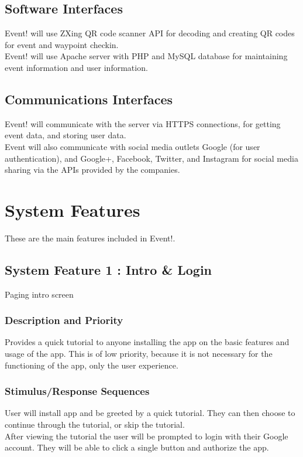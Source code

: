 \documentclass{scrreprt}
\begin{document}
\section{Software Interfaces}
Event! will use ZXing QR code scanner API for decoding and creating QR codes for 
event and waypoint checkin. \\
Event! will use Apache server with PHP and MySQL database for maintaining event 
information and user information.

\section{Communications Interfaces}
Event! will communicate with the server via HTTPS connections, for getting event 
data, and storing user data. \\
Event will also communicate with social media outlets Google (for user authentication), 
and Google+, Facebook, Twitter, and Instagram for social media sharing via the 
APIs provided by the companies.

\chapter{System Features}
These are the main features included in Event!.

\section{System Feature 1 : Intro \& Login}
Paging intro screen

\subsection{Description and Priority}
Provides a quick tutorial to anyone installing the app on the basic features and 
usage of the app. This is of low priority, because it is not necessary for the functioning 
of the app, only the user experience.

\subsection{Stimulus/Response Sequences}
User will install app and be greeted by a quick tutorial. They can then choose to 
continue through the tutorial, or skip the tutorial. \\
After viewing the tutorial the user will be prompted to login with their Google account.
They will be able to click a single button and authorize the app.
\end{document}
